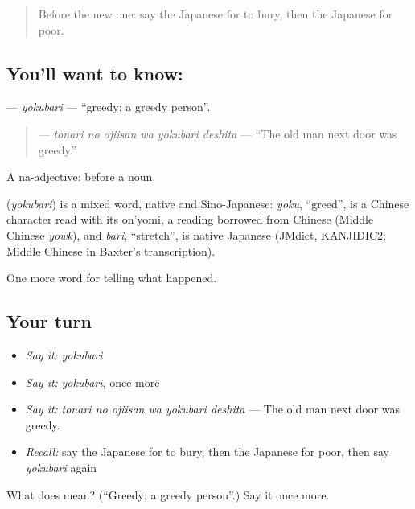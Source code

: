 \begin{quote}
Before the new one: say the Japanese for to bury, then the Japanese for poor.
\end{quote}

\subsection*{You'll want to know: }
\textbf{} — \emph{yokubari} — \textquotedblleft{}greedy; a greedy person\textquotedblright{}.

\begin{quote}
\textbf{  } — \emph{tonari no ojiisan wa yokubari deshita} — \textquotedblleft{}The old man next door was greedy.\textquotedblright{}
\end{quote}

A na-adjective:  before a noun.

\begin{cousinweb}
\textbf{} (\emph{yokubari}) is a mixed word, native and Sino-Japanese: \emph{yoku}, \textquotedblleft{}greed\textquotedblright{}, is a Chinese character read with its on'yomi, a reading borrowed from Chinese (Middle Chinese \emph{yowk}), and \emph{bari}, \textquotedblleft{}stretch\textquotedblright{}, is native Japanese (JMdict, KANJIDIC2; Middle Chinese in Baxter's transcription).
\end{cousinweb}

\begin{grammarlens}[title={What you've built}]
One more word for telling what happened.
\end{grammarlens}

\subsection*{Your turn}
\begin{itemize}
\raggedright
  \item \emph{Say it:} \emph{yokubari}
  \item \emph{Say it:} \emph{yokubari}, once more
  \item \emph{Say it:} \emph{tonari no ojiisan wa yokubari deshita} — The old man next door was greedy.
  \item \emph{Recall:} say the Japanese for to bury, then the Japanese for poor, then say \emph{yokubari} again
\end{itemize}

\begin{tcolorbox}[breakable,colback=teal!4,colframe=teal!35!black,title={Before you move on}]
What does  mean? (\textquotedblleft{}Greedy; a greedy person\textquotedblright{}.) Say it once more.
\end{tcolorbox}

